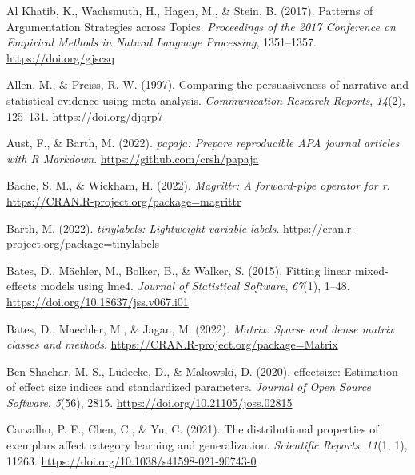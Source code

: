 \documentclass[
  man, donotrepeattitle,floatsintext]{apa7}
\newlength{\cslhangindent}
\newlength{\cslentryspacingunit} %
\newenvironment{CSLReferences}[2] %
 {%
  \setlength{\parindent}{0pt}
  \ifodd #1
  \let\oldpar\par
  \def\par{\hangindent=\cslhangindent\oldpar}
  \fi
  \setlength{\parskip}{#2\cslentryspacingunit}
 }%
 {}
\theoremstyle{definition}
\theoremstyle{definition}
\theoremstyle{definition}
\theoremstyle{definition}
\theoremstyle{remark}
\begin{document}
\hypertarget{refs}{}
\begin{CSLReferences}{1}{0}
\leavevmode{}%
Al Khatib, K., Wachsmuth, H., Hagen, M., \& Stein, B. (2017). Patterns of {Argumentation Strategies} across {Topics}. \emph{Proceedings of the 2017 {Conference} on {Empirical Methods} in {Natural} {Language Processing}}, 1351--1357. \url{https://doi.org/gjscsq}

\leavevmode{}%
Allen, M., \& Preiss, R. W. (1997). Comparing the persuasiveness of narrative and statistical evidence using meta‐analysis. \emph{Communication Research Reports}, \emph{14}(2), 125--131. \url{https://doi.org/djqrp7}

\leavevmode{}%
Aust, F., \& Barth, M. (2022). \emph{{papaja}: {Prepare} reproducible {APA} journal articles with {R Markdown}}. \url{https://github.com/crsh/papaja}

\leavevmode{}%
Bache, S. M., \& Wickham, H. (2022). \emph{Magrittr: A forward-pipe operator for r}. \url{https://CRAN.R-project.org/package=magrittr}

\leavevmode{}%
Barth, M. (2022). \emph{{tinylabels}: Lightweight variable labels}. \url{https://cran.r-project.org/package=tinylabels}

\leavevmode{}%
Bates, D., Mächler, M., Bolker, B., \& Walker, S. (2015). Fitting linear mixed-effects models using {lme4}. \emph{Journal of Statistical Software}, \emph{67}(1), 1--48. \url{https://doi.org/10.18637/jss.v067.i01}

\leavevmode{}%
Bates, D., Maechler, M., \& Jagan, M. (2022). \emph{Matrix: Sparse and dense matrix classes and methods}. \url{https://CRAN.R-project.org/package=Matrix}

\leavevmode{}%
Ben-Shachar, M. S., Lüdecke, D., \& Makowski, D. (2020). {e}ffectsize: Estimation of effect size indices and standardized parameters. \emph{Journal of Open Source Software}, \emph{5}(56), 2815. \url{https://doi.org/10.21105/joss.02815}

\leavevmode{}%
Carvalho, P. F., Chen, C., \& Yu, C. (2021). The distributional properties of exemplars affect category learning and generalization. \emph{Scientific Reports}, \emph{11}(1, 1), 11263. \url{https://doi.org/10.1038/s41598-021-90743-0}


\end{CSLReferences}
\end{document}
